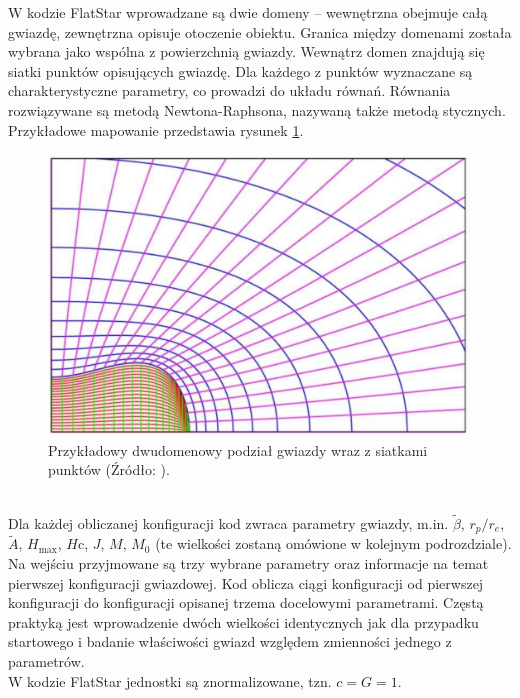 \documentclass{bachelor_thesis}
\begin{document}
        \indent W kodzie FlatStar wprowadzane są dwie domeny -- wewnętrzna obejmuje całą gwiazdę, zewnętrzna opisuje otoczenie obiektu. Granica między domenami została wybrana jako wspólna z powierzchnią gwiazdy. Wewnątrz domen znajdują się siatki punktów opisujących gwiazdę. Dla każdego z punktów wyznaczane są charakterystyczne parametry, co prowadzi do układu równań. Równania rozwiązywane są metodą Newtona-Raphsona, nazywaną także metodą stycznych. Przykładowe mapowanie przedstawia rysunek \ref{RysMap}.
        \begin{figure}[h!]
            \centering
            \includegraphics[scale=.27]{figures/RysMap.png}
            \caption{Przykładowy dwudomenowy podział gwiazdy wraz z siatkami punktów (Źródło: \citealp{Rosinska2017}).}
            \label{RysMap}
        \end{figure}\\
        \indent Dla każdej obliczanej konfiguracji kod zwraca parametry gwiazdy, m.in. $\tilde{\beta}$, $r_p/r_e$, $\tilde{A}$, $H_{\textrm{max}}$, $H\textrm{c}$, $J$, $M$, $M_0$ (te wielkości zostaną omówione w kolejnym podrozdziale). Na wejściu przyjmowane są trzy wybrane parametry oraz informacje na temat pierwszej konfiguracji gwiazdowej. Kod oblicza ciągi konfiguracji od pierwszej konfiguracji do konfiguracji opisanej trzema docelowymi parametrami. Częstą praktyką jest wprowadzenie dwóch wielkości identycznych jak dla przypadku startowego i badanie właściwości gwiazd względem zmienności jednego z parametrów.\\
        \indent W kodzie FlatStar jednostki są znormalizowane, tzn. $c=G=1$.
\end{document}
